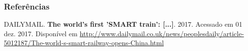 
\begin{frame}
\frametitle{Referências}
\footnotesize{

DAILYMAIL. \textbf{The world's first 'SMART train': [...]}. 2017. Acessado em 01 dez. 2017. Disponível em \url{http://www.dailymail.co.uk/news/peoplesdaily/article-5012187/The-world-s-smart-railway-opens-China.html}

}
\end{frame}

